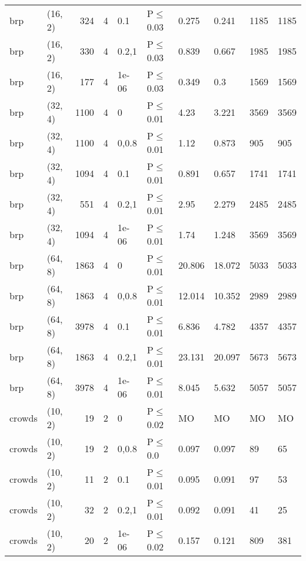 \begin{longtable}{llrrllllll}
 brp           & (16, 2)  &    	324 &   4 & 0.1   & P$\leq$0.03  & 0.275   & 0.241   & 1185    & 1185 \\
 brp           & (16, 2)  &    	330 &   4 & 0.2,1 & P$\leq$0.03  & 0.839   & 0.667   & 1985    & 1985 \\
 brp           & (16, 2)  &    	177 &   4 & 1e-06 & P$\leq$0.03  & 0.349   & 0.3     & 1569    & 1569 \\
 brp           & (32, 4)  &   	1100 &   4 & 0     & P$\leq$0.01  & 4.23    & 3.221   & 3569    & 3569 \\
 brp           & (32, 4)  &   	1100 &   4 & 0,0.8 & P$\leq$0.01  & 1.12    & 0.873   & 905     & 905  \\
 brp           & (32, 4)  &   	1094 &   4 & 0.1   & P$\leq$0.01  & 0.891   & 0.657   & 1741    & 1741 \\
 brp           & (32, 4)  &    	551 &   4 & 0.2,1 & P$\leq$0.01  & 2.95    & 2.279   & 2485    & 2485 \\
 brp           & (32, 4)  &   	1094 &   4 & 1e-06 & P$\leq$0.01  & 1.74    & 1.248   & 3569    & 3569 \\
 brp           & (64, 8)  &   	1863 &   4 & 0     & P$\leq$0.01  & 20.806  & 18.072  & 5033    & 5033 \\
 brp           & (64, 8)  &   	1863 &   4 & 0,0.8 & P$\leq$0.01  & 12.014  & 10.352  & 2989    & 2989 \\
 brp           & (64, 8)  &   	3978 &   4 & 0.1   & P$\leq$0.01  & 6.836   & 4.782   & 4357    & 4357 \\
 brp           & (64, 8)  &   	1863 &   4 & 0.2,1 & P$\leq$0.01  & 23.131  & 20.097  & 5673    & 5673 \\
 brp           & (64, 8)  &   	3978 &   4 & 1e-06 & P$\leq$0.01  & 8.045   & 5.632   & 5057    & 5057 \\
 crowds        & (10, 2)  &     	19 &   2 & 0     & P$\leq$0.02  & MO      & MO      & MO      & MO   \\
 crowds        & (10, 2)  &     	19 &   2 & 0,0.8 & P$\leq$0.0   & 0.097   & 0.097   & 89      & 65   \\
 crowds        & (10, 2)  &     	11 &   2 & 0.1   & P$\leq$0.01  & 0.095   & 0.091   & 97      & 53   \\
 crowds        & (10, 2)  &     	32 &   2 & 0.2,1 & P$\leq$0.01  & 0.092   & 0.091   & 41      & 25   \\
 crowds        & (10, 2)  &     	20 &   2 & 1e-06 & P$\leq$0.02  & 0.157   & 0.121   & 809     & 381  \\

\end{longtable}
